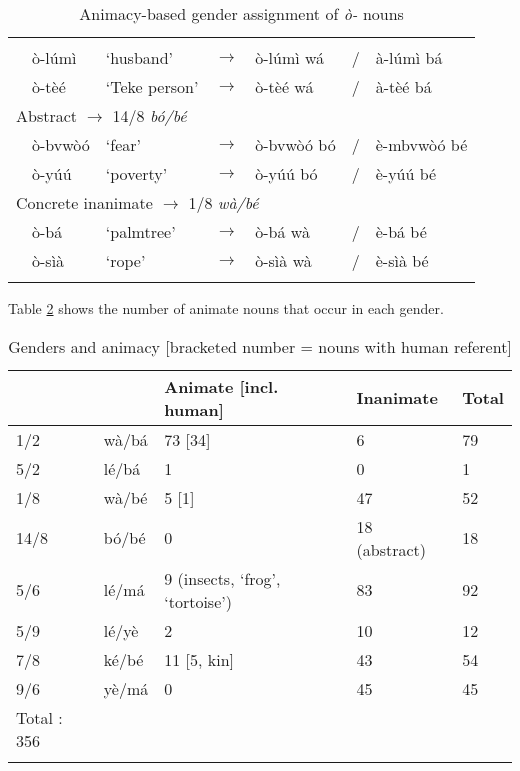 \documentclass[output=paper,,modfonts,nonflat]{langsci/langscibook-Hyman-et-al}
\begin{document}
\begin{table}[!htbp]
\caption{Animacy-based gender assignment of \textit{ò-} nouns}
\label{table14}
\begin{small}
\begin{tabular}{l		l		l		l		l		l		l}
\lsptoprule	
	\multicolumn{7}{l}{Animate $\rightarrow$ 1/2 \textit{wà/bá}}											\\
	& ò-lúmì	&	‘husband’	&	$\rightarrow$	&	ò-lúmì wá	&	/	&	à-lúmì bá	\\
	& ò-tèé	&	‘Teke person’	&	$\rightarrow$	&	ò-tèé wá	&	/	&	à-tèé bá	\\ [0.2cm]
	\multicolumn{7}{l}{Abstract $\rightarrow$ 14/8 \textit{bó/bé}}											\\
	& ò-bvwòó	&	‘fear’	&	$\rightarrow$	&	ò-bvwòó bó	&	/	&	è-mbvwòó bé	\\
	& ò-yúú	&	‘poverty’	&	$\rightarrow$	&	ò-yúú bó	&	/	&	è-yúú bé	\\ [0.2cm]
	\multicolumn{7}{l}{Concrete inanimate $\rightarrow$ 1/8 \textit{wà/bé}}											\\
	& ò-bá	&	‘palmtree’	&	$\rightarrow$	&	ò-bá wà	&	/	&	è-bá bé	\\
	& ò-sìà	&	‘rope’	&	$\rightarrow$	&	ò-sìà wà	&	/	&	è-sìà bé	\\
  \lspbottomrule
\end{tabular}
\end{small}
\end{table}

Table \ref{table15} shows the number of animate nouns that occur in each gender.

\begin{table}[!htbp]
\caption{Genders and animacy [bracketed number = nouns with human referent]}
\label{table15}
\begin{small}
\begin{tabular}{l		l		l		l		l	}
\lsptoprule	
	&		&	Animate [incl. human] 	&	Inanimate	&	Total	\\
\midrule									
1/2	&	wà/bá	&	\cellcolor{gray!60}73 [34]	&	6	&	79	\\
5/2	&	lé/bá	&	\cellcolor{gray!60}1	&	0	&	1	\\
1/8	&	wà/bé	&	5 [1]	&	\cellcolor{gray!60}47	&	52	\\
14/8	&	bó/bé	&	0	&	\cellcolor{gray!60}18 (abstract)	&	18	\\
5/6	&	lé/má	&	9 (insects, ‘frog’, ‘tortoise’)	&	\cellcolor{gray!60}83	&	92	\\
5/9	&	lé/yè	&	2	&	\cellcolor{gray!60}10	&	12	\\
7/8	&	ké/bé	&	11 [5, kin]	&	\cellcolor{gray!60}43	&	54	\\
9/6	&	yè/má	&	0	&	\cellcolor{gray!60}45	&	45	\\
						Total :		356	\\
\lspbottomrule
\end{tabular}
\end{small}
\end{table}
\end{document}
